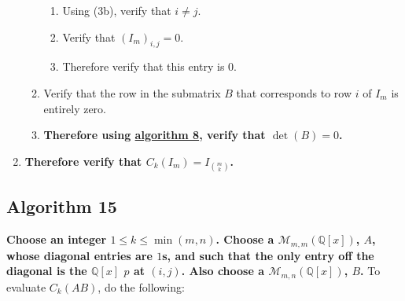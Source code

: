 \documentclass[twocolumn]{article}
\begin{document}
\begin{enumerate}
\begin{enumerate}
\begin{enumerate}
						\item Using (3b), verify that $i\ne j$.
						\item Verify that $(I_m)_{i,j}=0$.
						\item Therefore verify that this entry is $0$.
					\end{enumerate}
					\item Verify that the row in the submatrix $B$ that corresponds to row $i$ of $I_m$ is entirely zero.
					\item \textbf{Therefore using \hyperref[sec:algorithm 8]{algorithm 8}, verify that $\det(B)=0$.}
				\end{enumerate}
				\item \textbf{Therefore verify that $C_k(I_m)=I_{\binom{m}{k}}$.}	
			\end{enumerate}
		\subsection{Algorithm 15}\label{sec:algorithm 15}
			\textbf{Choose an integer $1\le k\le\min(m,n)$. Choose a $\mathcal{M}_{m,m}(\mathbb{Q}[x])$, $A$, whose diagonal entries are $1$s, and such that the only entry off the diagonal is the $\mathbb{Q}[x]$ $p$ at $(i,j)$. Also choose a $\mathcal{M}_{m,n}(\mathbb{Q}[x])$, $B$.} To evaluate $C_k(AB)$, do the following:
\end{document}
